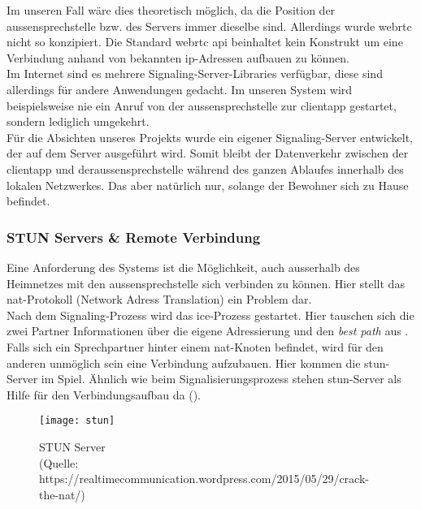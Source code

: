 Im unseren Fall wäre dies theoretisch möglich, da die Position der \gls{aussensprechstelle} bzw. des Servers immer dieselbe sind. Allerdings wurde \gls{webrtc} nicht so konzipiert. Die Standard \gls{webrtc} \gls{api} beinhaltet kein Konstrukt um eine Verbindung anhand von bekannten \gls{ip}-Adressen aufbauen zu können.
\\
Im Internet sind es mehrere Signaling-Server-Libraries verfügbar, diese sind allerdings für andere Anwendungen gedacht. Im unseren System wird beispielsweise nie ein Anruf von der \gls{aussensprechstelle} zur \gls{clientapp} gestartet, sondern lediglich umgekehrt.
\\
Für die Absichten unseres Projekts wurde ein eigener Signaling-Server entwickelt, der auf dem Server ausgeführt wird. Somit bleibt der Datenverkehr zwischen der \gls{clientapp} und der\gls{aussensprechstelle} während des ganzen Ablaufes innerhalb des lokalen Netzwerkes. Das aber natürlich nur, solange der Bewohner sich zu Hause befindet.

\subsubsection{STUN Servers \& Remote Verbindung}
\label{test}
Eine Anforderung des Systems ist die Möglichkeit, auch ausserhalb des Heimnetzes mit den \gls{aussensprechstelle} sich verbinden zu können. Hier stellt das \gls{nat}-Protokoll (Network Adress Translation) ein Problem dar.
\\
Nach dem Signaling-Prozess wird das \gls{ice}-Prozess gestartet. Hier tauschen sich die zwei Partner Informationen über die eigene Adressierung und den \textit{best path} aus \cite{_interactive_2016}. Falls sich ein Sprechpartner hinter einem \gls{nat}-Knoten befindet, wird für den anderen unmöglich sein eine Verbindung aufzubauen. Hier kommen die \gls{stun}-Server im Spiel. \cite{4th_webrtc_stunturn} 
Ähnlich wie beim Signalisierungsprozess stehen \gls{stun}-Server als Hilfe für den Verbindungsaufbau da ().

\begin{figure}[htb!]
	\begin{center}
		\texttt{[image: stun]}
		\caption[STUN Server]{STUN Server \\
			(Quelle: https://realtimecommunication.wordpress.com/2015/05/29/crack-the-nat/)}
		\label{fig:stun}
	\end{center}
\end{figure}

